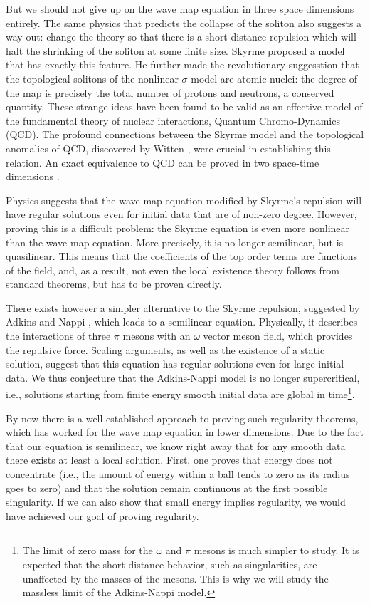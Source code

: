 \documentclass{amsart}
\begin{document}
But we should not give up on the wave map equation in three space dimensions entirely. The same physics that predicts the collapse of the soliton also suggests a way out: change the theory so that there is a short-distance repulsion which will halt the shrinking of the soliton at some finite size. Skyrme \cite{MR0128862} proposed a model that has exactly this feature. He further made the revolutionary suggesstion that the topological solitons of the nonlinear $\sigma$ model are atomic nuclei: the degree of the map is precisely the total number of protons and neutrons, a conserved quantity. These strange ideas have been found to be valid as an effective model \cite{SyracuseSkyrme,Witten} of the fundamental theory of nuclear interactions, Quantum Chromo-Dynamics (QCD). The profound connections between the Skyrme model and the topological anomalies of QCD, discovered by Witten \cite{Witten}, were crucial in establishing this relation. An exact equivalence  to QCD can be proved in  two space-time dimensions \cite{RajeevQHD}.

Physics suggests that the wave map equation modified by Skyrme's repulsion will have regular solutions even for initial data that are of non-zero degree. However, proving this is a difficult problem: the Skyrme equation is even more nonlinear than the wave map equation. More precisely, it is no longer semilinear, but is  quasilinear. This means that the coefficients of the top order terms are functions of the field, and, as a result, not even the local existence theory follows from standard theorems, but has to be proven directly.

There exists however a simpler  alternative to the Skyrme repulsion, suggested by Adkins and Nappi \cite{AN}, which leads to a semilinear equation. Physically, it describes the interactions of three $\pi$ mesons with an $\omega$ vector meson field, which provides the repulsive force. Scaling arguments, as well as the existence of  a static solution, suggest that this equation has regular solutions even for large initial data. We thus conjecture that the Adkins-Nappi model is no longer supercritical, i.e., solutions starting from finite energy smooth initial data are global in time\footnote{The limit of zero mass for the $\omega$ and $\pi$ mesons is much simpler to study.  It is expected that the short-distance behavior, such as singularities, are unaffected by the masses of the mesons. This is why we will study the massless limit of the Adkins-Nappi model.}.

By now there is a well-established approach to proving such regularity theorems, which has worked for the wave map equation in lower dimensions. Due to the fact that our equation is semilinear, we know right away that for any smooth data there exists at least a local solution.  First, one proves that energy does not concentrate (i.e., the amount of energy within a ball tends to zero as its  radius goes to zero) and that the solution remain continuous at the first possible singularity. If we can also show that small energy implies regularity, we would have achieved our goal of proving regularity.
\end{document}
